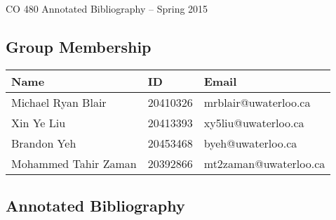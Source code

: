 \documentclass[11pt]{article}
\begin{document}
\begin{center}
{\Large CO 480 Annotated Bibliography -- Spring 2015} 
\end{center}

\subsection*{Group Membership}
\begin{tabular}{|l|l|l|} \hline
\textbf{Name} & \textbf{ID} & \textbf{Emai}l \\ \hline
Michael Ryan Blair & 20410326 & mrblair@uwaterloo.ca \\ \hline
Xin Ye Liu & 20413393 & xy5liu@uwaterloo.ca\\ \hline
Brandon Yeh & 20453468 & byeh@uwaterloo.ca\\ \hline
Mohammed Tahir Zaman & 20392866 & mt2zaman@uwaterloo.ca\\ \hline
\end{tabular}

\subsection*{Annotated Bibliography}
\end{document}

